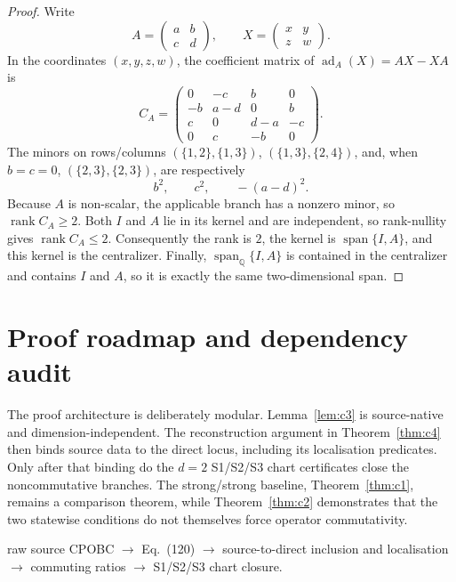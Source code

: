 \documentclass[11pt]{article}
\theoremstyle{definition}
\theoremstyle{remark}
\newcommand{\QQ}{\mathbb{Q}}
\begin{document}
\begin{proof}
Write
\[
 A=\begin{pmatrix}a&b\\c&d\end{pmatrix},\qquad
 X=\begin{pmatrix}x&y\\z&w\end{pmatrix}.
\]
In the coordinates \((x,y,z,w)\), the coefficient matrix of
\(\operatorname{ad}_A(X)=AX-XA\) is
\[
 C_A=\begin{pmatrix}
 0&-c&b&0\\
 -b&a-d&0&b\\
 c&0&d-a&-c\\
 0&c&-b&0
 \end{pmatrix}.
\]
The minors on rows/columns
\((\{1,2\},\{1,3\})\),
\((\{1,3\},\{2,4\})\), and, when \(b=c=0\),
\((\{2,3\},\{2,3\})\), are respectively
\[
  b^2,\qquad c^2,\qquad -(a-d)^2.
\]
Because \(A\) is non-scalar, the applicable branch has a nonzero minor, so
\(\operatorname{rank} C_A\geq2\).  Both \(I\) and \(A\) lie in its kernel and
are independent, so rank-nullity gives \(\operatorname{rank} C_A\leq2\).
Consequently the rank is \(2\), the kernel is
\(\operatorname{span}\{I,A\}\), and this kernel is the centralizer.  Finally,
\(\operatorname{span}_{\QQ}\{I,A\}\) is contained in the centralizer and
contains \(I\) and \(A\), so it is exactly the same two-dimensional span.
\end{proof}

\section{Proof roadmap and dependency audit}

The proof architecture is deliberately modular.  Lemma~\ref{lem:c3} is
source-native and dimension-independent.  The reconstruction argument in
Theorem~\ref{thm:c4} then binds source data to the direct locus, including
its localisation predicates.  Only after that binding do the \(d=2\)
S1/S2/S3 chart certificates close the noncommutative branches.  The
strong/strong baseline, Theorem~\ref{thm:c1}, remains a comparison theorem,
while Theorem~\ref{thm:c2} demonstrates that the two statewise conditions do
not themselves force operator commutativity.

\begin{center}
\small
raw source CPOBC \(\longrightarrow\) Eq.~(120)
\(\longrightarrow\) source-to-direct inclusion and localisation
\(\longrightarrow\) commuting ratios
\(\longrightarrow\) S1/S2/S3 chart closure.
\end{center}
\end{document}
